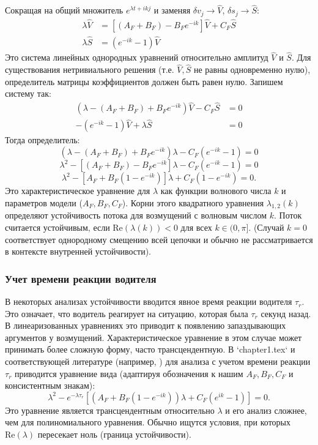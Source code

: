 \documentclass[12pt, a4paper]{article}
\begin{document}
Сокращая на общий множитель $e^{\lambda t + i k j}$ и заменяя $\delta v_j \to \hat{V}$, $\delta s_j \to \hat{S}$:
\begin{align}
\lambda \hat{V} &= [(A_F + B_F) - B_F e^{-ik}] \hat{V} + C_F \hat{S} \label{eq:wave_eq1_amp} \\
\lambda \hat{S} &= (e^{-ik} - 1) \hat{V} \label{eq:wave_eq2_amp}
\end{align}
Это система линейных однородных уравнений относительно амплитуд $\hat{V}$ и $\hat{S}$. Для существования нетривиального решения (т.е. $\hat{V}, \hat{S}$ не равны одновременно нулю), определитель матрицы коэффициентов должен быть равен нулю.
Запишем систему так:
\begin{align*}
(\lambda - (A_F+B_F) + B_F e^{-ik}) \hat{V} - C_F \hat{S} &= 0 \\
-(e^{-ik}-1)\hat{V} + \lambda \hat{S} &= 0
\end{align*}
Тогда определитель:
\[ (\lambda - (A_F+B_F) + B_F e^{-ik})\lambda - C_F (e^{-ik}-1) = 0 \]
\[ \lambda^2 - [(A_F+B_F) - B_F e^{-ik}] \lambda - C_F (e^{-ik}-1) = 0 \]
\begin{equation}
\label{eq:characteristic_equation_k_lambda}
\lambda^2 - [A_F + B_F(1 - e^{-ik})] \lambda + C_F (1 - e^{-ik}) = 0.
\end{equation}
Это характеристическое уравнение для $\lambda$ как функции волнового числа $k$ и параметров модели ($A_F, B_F, C_F$). Корни этого квадратного уравнения $\lambda_{1,2}(k)$ определяют устойчивость потока для возмущений с волновым числом $k$. Поток считается устойчивым, если $\text{Re}(\lambda(k)) < 0$ для всех $k \in (0, \pi]$. (Случай $k=0$ соответствует однородному смещению всей цепочки и обычно не рассматривается в контексте внутренней устойчивости).

\subsubsection{Учет времени реакции водителя}
В некоторых анализах устойчивости вводится явное время реакции водителя $\tau_r$. Это означает, что водитель реагирует на ситуацию, которая была $\tau_r$ секунд назад. В линеаризованных уравнениях это приводит к появлению запаздывающих аргументов у возмущений.
Характеристическое уравнение в этом случае может принимать более сложную форму, часто трансцендентную. В `chapter1.tex` и соответствующей литературе (например, \cite{treiber2013traffic}) для анализа с учетом времени реакции $\tau_r$ приводится уравнение вида (адаптируя обозначения к нашим $A_F, B_F, C_F$ и консистентным знакам):
\begin{equation}
\label{eq:char_eq_tau_r_final_consistent}
\lambda^2 - e^{-\lambda \tau_r} \left[ (A_F + B_F(1 - e^{-ik}))\lambda + C_F(e^{ik}-1) \right] = 0.
\end{equation}
Это уравнение является трансцендентным относительно $\lambda$ и его анализ сложнее, чем для полиномиального уравнения. Обычно ищутся условия, при которых $\text{Re}(\lambda)$ пересекает ноль (граница устойчивости).
\end{document}
